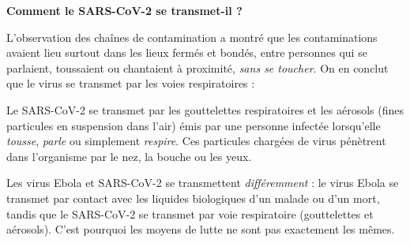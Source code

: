 \documentclass[11pt]{article}
\newcommand{\cle}[1]{{\popxbold\color{popdark}#1}}
\begin{document}
\textbf{Comment le SARS-CoV-2 se transmet-il ?}

L'observation des chaînes de contamination a montré que les contaminations avaient lieu surtout dans les lieux fermés et bondés, entre personnes qui se parlaient, toussaient ou chantaient à proximité, \emph{sans se toucher}. On en conclut que le virus se transmet par les voies respiratoires :

\begin{propriete}
Le SARS-CoV-2 se transmet par les \cle{gouttelettes respiratoires} et les \cle{aérosols} (fines particules en suspension dans l'air) émis par une personne infectée lorsqu'elle \emph{tousse}, \emph{parle} ou simplement \emph{respire}. Ces particules chargées de virus pénètrent dans l'organisme par le nez, la bouche ou les yeux.
\end{propriete}

\begin{propriete}
Les virus Ebola et SARS-CoV-2 se transmettent \emph{différemment} : le virus Ebola se transmet par \cle{contact} avec les liquides biologiques d'un malade ou d'un mort, tandis que le SARS-CoV-2 se transmet par \cle{voie respiratoire} (gouttelettes et aérosols). C'est pourquoi les moyens de lutte ne sont pas exactement les mêmes.
\end{propriete}
\end{document}

